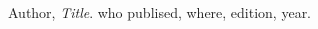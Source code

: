\documentclass[../document]{subfiles}
\begin{document}
\begin{thebibliography}{1}
\label{Bibliography}


  Author,
  {\em Title}.
  who publised, where,
  edition,
  year.


\end{thebibliography}
\end{document}
